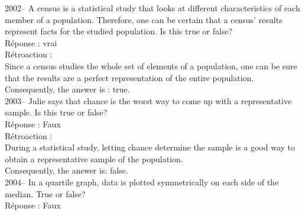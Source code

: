 \documentclass[letterpaper, 12pt]{article}
\begin{document}

2002-- A census is a statistical study that looks at different characteristics of each member of a population. Therefore, one can be certain that a census' results represent facts for the studied population. Is this true or false?\\

R\'eponse : vrai\\

R\'etroaction :\\
Since a census studies the whole set of elements of a population, one can be sure that the results are a perfect representation of the entire population.\\
Consequently, the answer is : true.\\

2003-- Julie says that chance is the worst way to come up with a representative sample. Is this true or false? \\

R\'eponse : Faux\\

R\'etroaction :\\
During a statistical study, letting chance determine the sample is a good way to obtain a representative sample of the population. \\
Consequently, the answer is: false.\\


2004-- In a quartile graph, data is plotted symmetrically on each side of the median. True or false?\\

R\'eponse : Faux\\
\end{document}
